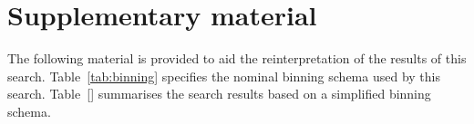 
\clearpage



\appendix


\clearpage
\section*{Supplementary material} 

The following material is provided to aid the reinterpretation of the
results of this search. Table~\ref{tab:binning} specifies the nominal
binning schema used by this search. Table~\ref{} summarises the search
results based on a simplified binning schema. 

